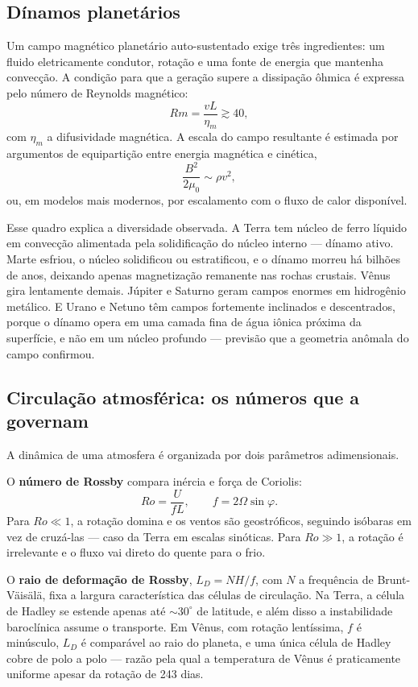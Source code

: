 \documentclass[11pt,a4paper]{article}
\begin{document}
\subsection*{Dínamos planetários}

Um campo magnético planetário auto-sustentado exige três ingredientes: um fluido eletricamente condutor, rotação e uma fonte de energia que mantenha convecção. A condição para que a geração supere a dissipação ôhmica é expressa pelo número de Reynolds magnético:
\[
Rm=\frac{vL}{\eta_m}\gtrsim40,
\]
com $\eta_m$ a difusividade magnética. A escala do campo resultante é estimada por argumentos de equipartição entre energia magnética e cinética,
\[
\frac{B^{2}}{2\mu_0}\sim\rho v^{2},
\]
ou, em modelos mais modernos, por escalamento com o fluxo de calor disponível.

Esse quadro explica a diversidade observada. A Terra tem núcleo de ferro líquido em convecção alimentada pela solidificação do núcleo interno --- dínamo ativo. Marte esfriou, o núcleo solidificou ou estratificou, e o dínamo morreu há bilhões de anos, deixando apenas magnetização remanente nas rochas crustais. Vênus gira lentamente demais. Júpiter e Saturno geram campos enormes em hidrogênio metálico. E Urano e Netuno têm campos fortemente inclinados e descentrados, porque o dínamo opera em uma camada fina de água iônica próxima da superfície, e não em um núcleo profundo --- previsão que a geometria anômala do campo confirmou.

\subsection*{Circulação atmosférica: os números que a governam}

A dinâmica de uma atmosfera é organizada por dois parâmetros adimensionais.

O \textbf{número de Rossby} compara inércia e força de Coriolis:
\[
Ro=\frac{U}{fL},
\qquad
f=2\Omega\sin\varphi.
\]
Para $Ro\ll1$, a rotação domina e os ventos são geostróficos, seguindo isóbaras em vez de cruzá-las --- caso da Terra em escalas sinóticas. Para $Ro\gg1$, a rotação é irrelevante e o fluxo vai direto do quente para o frio.

O \textbf{raio de deformação de Rossby}, $L_D=NH/f$, com $N$ a frequência de Brunt-Väisälä, fixa a largura característica das células de circulação. Na Terra, a célula de Hadley se estende apenas até $\sim30^\circ$ de latitude, e além disso a instabilidade baroclínica assume o transporte. Em Vênus, com rotação lentíssima, $f$ é minúsculo, $L_D$ é comparável ao raio do planeta, e uma única célula de Hadley cobre de polo a polo --- razão pela qual a temperatura de Vênus é praticamente uniforme apesar da rotação de 243 dias.
\end{document}
